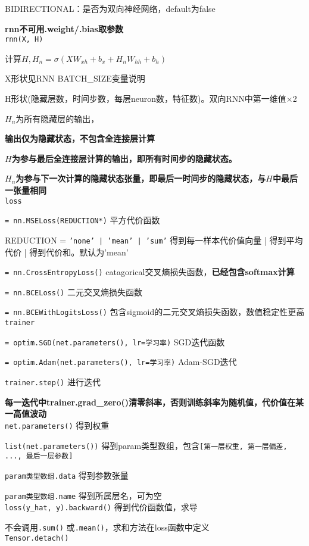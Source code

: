 \documentclass[UTF8]{ctexart}
\begin{document}
  BIDIRECTIONAL：是否为双向神经网络，default为false
  
  \textbf{rnn不可用.weight/.bias取参数}\\
\texttt{rnn(X, H)}

  计算$H, H_n = \sigma(XW_{xh} + b_x + H_nW_{hh} + b_h)$

  \quad X形状见RNN BATCH\_SIZE变量说明

  \quad H形状(隐藏层数，时间步数，每层neuron数，特征数)。双向RNN中第一维值$\times$2

  \quad $H_n$为所有隐藏层的输出，
  
  \textbf{输出仅为隐藏状态，不包含全连接层计算}

  \textbf{$H$为参与最后全连接层计算的输出，即所有时间步的隐藏状态。}
  
  \textbf{$H_n$为参与下一次计算的隐藏状态张量，即最后一时间步的隐藏状态，与$H$中最后一张量相同}\\
\texttt{loss}

  \texttt{= nn.MSELoss(REDUCTION*)} 平方代价函数

  \quad REDUCTION = \texttt{'none' | 'mean' | 'sum'} 得到每一样本代价值向量 | 得到平均代价 | 得到代价和。默认为'mean'

  \texttt{= nn.CrossEntropyLoss()} catagorical交叉熵损失函数，\textbf{已经包含softmax计算}
  
  \texttt{= nn.BCELoss()} 二元交叉熵损失函数
  
  \texttt{= nn.BCEWithLogitsLoss()} 包含sigmoid的二元交叉熵损失函数，数值稳定性更高\\
\texttt{trainer}

  \texttt{= optim.SGD(net.parameters(), lr=学习率)} SGD迭代函数

  \texttt{= optim.Adam(net.parameters(), lr=学习率)} Adam-SGD迭代

  \texttt{trainer.step()} 进行迭代
  
  \textbf{每一迭代中trainer.grad\_zero()清零斜率，否则训练斜率为随机值，代价值在某一高值波动}\\
\texttt{net.parameters()} 得到权重

  \texttt{list(net.parameters())} 得到param类型数组，包含\texttt{[第一层权重, 第一层偏差, ..., 最后一层参数]}
  
  \texttt{param类型数组.data} 得到参数张量
  
  \texttt{param类型数组.name} 得到所属层名，可为空\\
\texttt{loss(y\_hat, y).backward()} 得到代价函数值，求导

  不会调用\texttt{.sum()} 或\texttt{.mean()}，求和方法在loss函数中定义\\
\texttt{Tensor.detach()}
\end{document}
